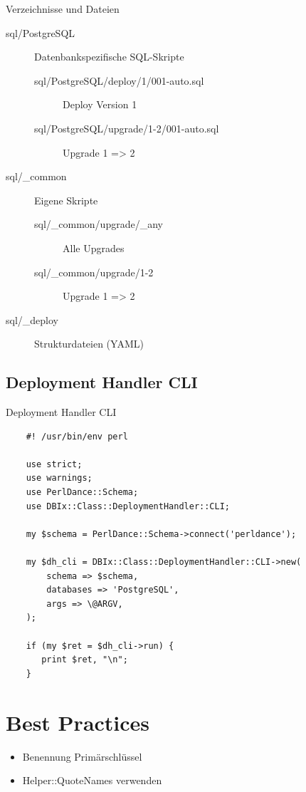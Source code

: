 \begin{frame}[fragile]{Verzeichnisse und Dateien}
\begin{description}
\item[sql/PostgreSQL] Datenbankspezifische SQL-Skripte
\begin{description}
\item[sql/PostgreSQL/deploy/1/001-auto.sql] Deploy Version 1
\item[sql/PostgreSQL/upgrade/1-2/001-auto.sql] Upgrade 1 => 2
\end{description}
\item[sql/\_common] Eigene Skripte
\begin{description}
\item[sql/\_common/upgrade/\_any] Alle Upgrades
\item[sql/\_common/upgrade/1-2] Upgrade 1 => 2
\end{description}
\item[sql/\_deploy] Strukturdateien (YAML)
\end{description}
\end{frame}

\subsection{Deployment Handler CLI}

\begin{frame}[fragile]{Deployment Handler CLI}
\begin{lstlisting}
    #! /usr/bin/env perl

    use strict;
    use warnings;
    use PerlDance::Schema;
    use DBIx::Class::DeploymentHandler::CLI;

    my $schema = PerlDance::Schema->connect('perldance');

    my $dh_cli = DBIx::Class::DeploymentHandler::CLI->new(
        schema => $schema,
        databases => 'PostgreSQL',
        args => \@ARGV,
    );

    if (my $ret = $dh_cli->run) {
       print $ret, "\n";
    }
\end{lstlisting}
\end{frame}

\section{Best Practices}

\begin{itemize}
\item Benennung Primärschlüssel
\item Helper::QuoteNames verwenden
\end{itemize}

